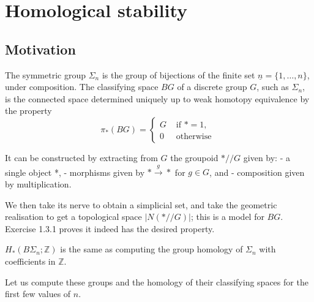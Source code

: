 
\part{Homological stability}
\chapter{Motivation}


\cite{kupersHomologicalStabilityMinicourse2021}

The symmetric group $\Sigma_n$ is the group of bijections of the finite set $\underline{n}=\{1, \ldots, n\}$, under composition. The classifying space $B G$ of a discrete group $G$, such as $\Sigma_n$, is the connected space determined uniquely up to weak homotopy equivalence by the property
$$
\pi_*(B G)= \begin{cases}G & \text { if } *=1, \\ 0 & \text { otherwise }\end{cases}
$$

It can be constructed by extracting from $G$ the groupoid $* / / G$ given by:
- a single object *,
- morphisms given by $* \xrightarrow{g} *$ for $g \in G$, and
- composition given by multiplication.

We then take its nerve to obtain a simplicial set, and take the geometric realisation to get a topological space $|N(* / / G)|$; this is a model for $B G$. Exercise 1.3.1 proves it indeed has the desired property.


\begin{prop}
    $H_*\left(B \Sigma_n ; \mathbb{Z}\right)$  is the same as computing the group homology of $\Sigma_n$ with coefficients in $\mathbb{Z}$.
\end{prop}
Let us compute these groups and the homology of their classifying spaces for the first few values of $n$.

